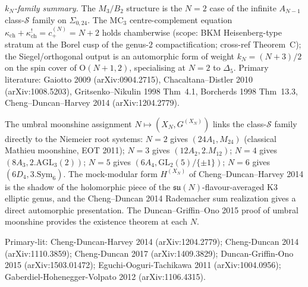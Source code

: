 \begin{remark}
\emph{$k_N$-family summary.} The $M_3/B_2$ structure is the $N = 2$ case of
the infinite $A_{N-1}$ class-$\mathcal S$ family on $\Sigma_{0,24}$. The
MC$_3$ centre-complement equation
$\kappa_{\mathrm{ch}} + \kappa_{\mathrm{ch}}^! = c_+^{(N)} = N{+}2$
holds chamberwise (scope: BKM Heisenberg-type stratum at the Borel cusp
of the genus-$2$ compactification; cross-ref Theorem~C); the
Siegel/orthogonal output is an automorphic form of weight
$k_N = (N+3)/2$ on the spin cover of $\mathrm{O}(N{+}1,2)$, specialising
at $N = 2$ to $\Delta_5$. Primary literature: Gaiotto 2009
(arXiv:0904.2715), Chacaltana--Distler 2010 (arXiv:1008.5203),
Gritsenko--Nikulin 1998 Thm~4.1, Borcherds 1998 Thm~13.3,
Cheng--Duncan--Harvey 2014 (arXiv:1204.2779).
\end{remark}

\begin{remark}
\label{rem:m3b2-umbral-extension}
The umbral moonshine assignment $N \mapsto (X_N, G^{(X_N)})$ links the
class-$\mathcal S$ family directly to the Niemeier root systems:
$N=2$ gives $(24A_1, M_{24})$ (classical Mathieu moonshine, EOT 2011);
$N=3$ gives $(12A_2, 2.M_{12})$; $N=4$ gives $(8A_3, 2.\mathrm{AGL}_3(2))$;
$N=5$ gives $(6A_4, \mathrm{GL}_2(5)/\{\pm 1\})$; $N=6$ gives
$(6D_4, 3.\mathrm{Sym}_6)$. The mock-modular form $H^{(X_N)}$
of Cheng--Duncan--Harvey 2014 is the shadow of the holomorphic
piece of the $\mathfrak{su}(N)$-flavour-averaged K3 elliptic genus,
and the Cheng--Duncan 2014 Rademacher sum realization gives a
direct automorphic presentation. The Duncan--Griffin--Ono 2015
proof of umbral moonshine provides the existence theorem at each $N$.

Primary-lit: Cheng-Duncan-Harvey 2014 (arXiv:1204.2779);
Cheng-Duncan 2014 (arXiv:1110.3859);
Cheng-Duncan 2017 (arXiv:1409.3829);
Duncan-Griffin-Ono 2015 (arXiv:1503.01472);
Eguchi-Ooguri-Tachikawa 2011 (arXiv:1004.0956);
Gaberdiel-Hohenegger-Volpato 2012 (arXiv:1106.4315).
\end{remark}
